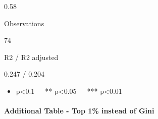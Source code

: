 \documentclass[
]{article}
\providecommand{\tightlist}{%
  \setlength{\itemsep}{0pt}\setlength{\parskip}{0pt}}
\begin{document}
0.58

Observations

74

R2 / R2 adjusted

0.247 / 0.204

\begin{itemize}
\tightlist
\item
  p\textless0.1~~~** p\textless0.05~~~*** p\textless0.01
\end{itemize}

\hypertarget{additional-table---top-1-instead-of-gini}{%
\paragraph{Additional Table - Top 1\% instead of
Gini}\label{additional-table---top-1-instead-of-gini}}
\end{document}
